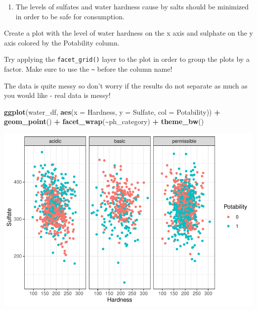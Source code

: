 \documentclass[
]{book}
\newenvironment{Shaded}{\begin{snugshade}}{\end{snugshade}}
\newcommand{\AttributeTok}[1]{\textcolor[rgb]{0.13,0.29,0.53}{#1}}
\newcommand{\FunctionTok}[1]{\textcolor[rgb]{0.13,0.29,0.53}{\textbf{#1}}}
\newcommand{\NormalTok}[1]{#1}
\newcommand{\SpecialCharTok}[1]{\textcolor[rgb]{0.81,0.36,0.00}{\textbf{#1}}}
\providecommand{\tightlist}{%
  \setlength{\itemsep}{0pt}\setlength{\parskip}{0pt}}
\begin{document}
\begin{enumerate}
\def\labelenumi{\arabic{enumi}.}
\setcounter{enumi}{5}
\tightlist
\item
  The levels of sulfates and water hardness cause by salts should be minimized in order to be safe for consumption.
\end{enumerate}

Create a plot with the level of water hardness on the x axis and sulphate on the y axis colored by the Potability column.

Try applying the \texttt{facet\_grid()} layer to the plot in order to group the plots by a factor. Make sure to use the \texttt{\textasciitilde{}} before the column name!

The data is quite messy so don't worry if the results do not separate as much as you would like - real data is messy!

\begin{Shaded}
\begin{Highlighting}[]
\FunctionTok{ggplot}\NormalTok{(water\_df, }\FunctionTok{aes}\NormalTok{(}\AttributeTok{x =}\NormalTok{ Hardness, }\AttributeTok{y =}\NormalTok{ Sulfate, }\AttributeTok{col =}\NormalTok{ Potability)) }\SpecialCharTok{+} 
  \FunctionTok{geom\_point}\NormalTok{() }\SpecialCharTok{+} 
  \FunctionTok{facet\_wrap}\NormalTok{(}\SpecialCharTok{\textasciitilde{}}\NormalTok{ph\_category) }\SpecialCharTok{+} \FunctionTok{theme\_bw}\NormalTok{()}
\end{Highlighting}
\end{Shaded}

\includegraphics{_main_files/figure-latex/unnamed-chunk-64-1.pdf}
\end{document}
